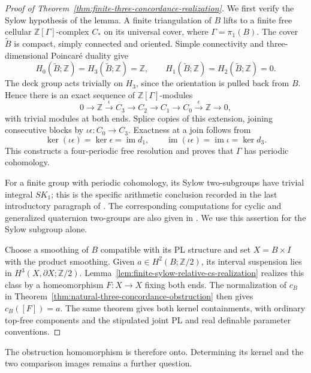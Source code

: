 \begin{proof}[Proof of Theorem~\ref{thm:finite-three-concordance-realization}]
We first verify the Sylow hypothesis of the lemma.  A finite
triangulation of $B$ lifts to a finite free cellular
$\mathbb Z[\Gamma]$-complex $C_*$ on its universal cover,
where $\Gamma=\pi_1(B)$.  The cover $\widetilde B$ is compact,
simply connected and oriented.  Simple connectivity and
three-dimensional Poincar\'e duality give
\[
 H_0(\widetilde B;\mathbb Z)
   =H_3(\widetilde B;\mathbb Z)=\mathbb Z,
 \qquad
 H_1(\widetilde B;\mathbb Z)
   =H_2(\widetilde B;\mathbb Z)=0.
\]
The deck group acts trivially on $H_3$, since the orientation
is pulled back from $B$.  Hence there is an exact sequence
of $\mathbb Z[\Gamma]$-modules
\begin{equation}\label{eq:finite-three-periodic-extension}
 0\longrightarrow\mathbb Z\xrightarrow{\iota}C_3
 \longrightarrow C_2\longrightarrow C_1
 \longrightarrow C_0\xrightarrow{\epsilon}\mathbb Z
 \longrightarrow0,
\end{equation}
with trivial modules at both ends.  Splice copies of this
extension, joining consecutive blocks by
$\iota\epsilon:C_0\to C_3$.  Exactness at a join follows
from
\[
 \ker(\iota\epsilon)=\ker\epsilon=\operatorname{im}d_1,
 \qquad
 \operatorname{im}(\iota\epsilon)
     =\operatorname{im}\iota=\ker d_3.
\]
This constructs a four-periodic free resolution and proves
that $\Gamma$ has periodic cohomology.

For a finite group with periodic cohomology, its Sylow
two-subgroups have trivial integral $SK_1$; this is the
specific arithmetic conclusion recorded in the last
introductory paragraph of
\cite[p.~352]{HambletonMilgramTaylorWilliams1988}.
The corresponding computations for cyclic and generalized
quaternion two-groups are also given in
\cite[Introduction, Example~2, p.~14; Example~14.4,
p.~333]{Oliver1988Whitehead}.
We use this assertion for the Sylow subgroup alone.

Choose a smoothing of $B$ compatible with its PL structure
\cite[Essay~I, p.~39]{KirbySiebenmann1977}
and set $X=B\times I$ with the product smoothing.
Given $a\in H^2(B;\mathbb Z/2)$, its interval suspension
lies in $H^3(X,\partial X;\mathbb Z/2)$.
Lemma~\ref{lem:finite-sylow-relative-cs-realization}
realizes this class by a homeomorphism $F:X\to X$
fixing both ends.  The normalization of $c_B$ in
Theorem~\ref{thm:natural-three-concordance-obstruction}
then gives $c_B([F])=a$.
The same theorem gives both kernel containments, with
ordinary top-free components and the stipulated joint PL
and real definable parameter conventions.
\end{proof}

The obstruction homomorphism is therefore onto. Determining
its kernel and the two comparison images remains a further question.
